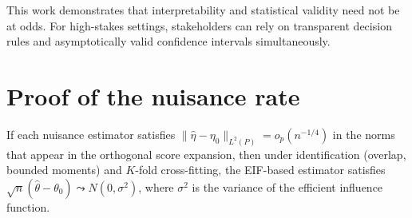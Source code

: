 \documentclass[12pt]{article}
\begin{document}
This work demonstrates that interpretability and statistical validity need not be at odds. For high-stakes settings, stakeholders can rely on transparent decision rules and asymptotically valid confidence intervals simultaneously.

\appendix
\section{Proof of the nuisance rate}
\label{app:nuisance-rate}





\begin{corollary}
\label{cor:dml}
If each nuisance estimator satisfies $\|\hat\eta - \eta_0\|_{L^2(P)} = o_p(n^{-1/4})$ in the norms that appear in the orthogonal score expansion, then under identification (overlap, bounded moments) and $K$-fold cross-fitting, the EIF-based estimator satisfies $\sqrt{n}(\hat\theta - \theta_0) \leadsto N(0, \sigma^2)$, where $\sigma^2$ is the variance of the efficient influence function.
\end{corollary}
\end{document}

